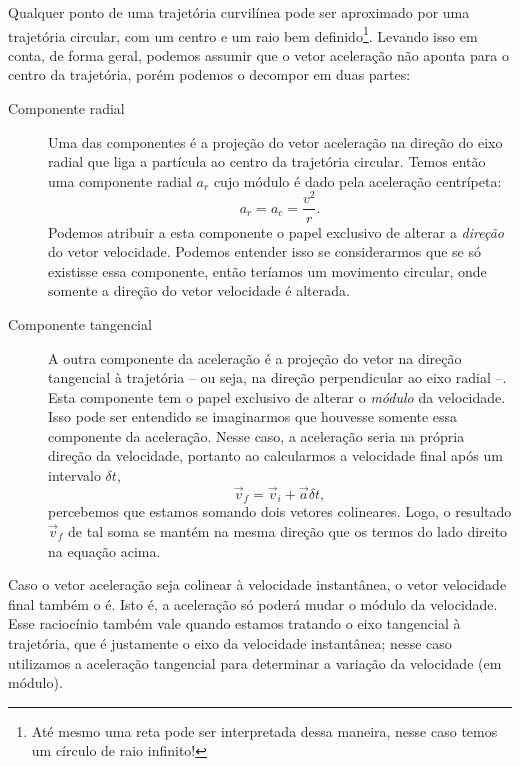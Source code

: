 Qualquer ponto de uma trajetória curvilínea pode ser aproximado por uma trajetória circular, com um centro e um raio bem definido\footnote{Até mesmo uma reta pode ser interpretada dessa maneira, nesse caso temos um círculo de raio infinito!}. Levando isso em conta, de forma geral, podemos assumir que o vetor aceleração não aponta para o centro da trajetória, porém podemos o decompor em duas partes:
\begin{description}
  \item[Componente radial] Uma das componentes é a projeção do vetor aceleração na direção do eixo radial que liga a partícula ao centro da trajetória circular. Temos então uma componente radial $a_r$ cujo módulo é dado pela aceleração centrípeta:
  \begin{equation}
    a_r = a_c = \frac{v^2}{r}.
  \end{equation}
  Podemos atribuir a esta componente o papel exclusivo de alterar a \emph{direção} do vetor velocidade. Podemos entender isso se considerarmos que se só existisse essa componente, então teríamos um movimento circular, onde somente a direção do vetor velocidade é alterada.
  \item[Componente tangencial] A outra componente da aceleração é a projeção do vetor na direção tangencial à trajetória -- ou seja, na direção perpendicular ao eixo radial --. Esta componente tem o papel exclusivo de alterar o \emph{módulo} da velocidade. Isso pode ser entendido se imaginarmos que houvesse somente essa componente da aceleração. Nesse caso, a aceleração seria na própria direção da velocidade, portanto ao calcularmos a velocidade final após um intervalo $\delta t$,
  \begin{equation}
    \vec{v}_f = \vec{v}_i + \vec{a} \delta t,
  \end{equation}
%
percebemos que estamos somando dois vetores colineares. Logo, o resultado $\vec{v}_f$ de tal soma se mantém na mesma direção que os termos do lado direito na equação acima.
\end{description}

\begin{marginfigure}
\centering

\caption{Caso o vetor aceleração seja colinear à velocidade instantânea, o vetor velocidade final também o é. Isto é, a aceleração só poderá mudar o módulo da velocidade. Esse raciocínio também vale quando estamos tratando o eixo tangencial à trajetória, que é justamente o eixo da velocidade instantânea; nesse caso utilizamos a aceleração tangencial para determinar a variação da velocidade (em módulo).}
\end{marginfigure}

